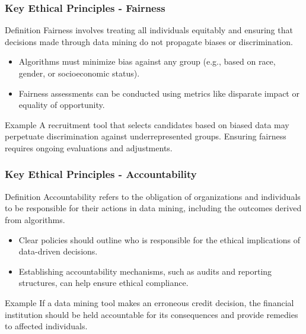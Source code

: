 \documentclass{beamer}
\begin{document}
\begin{frame}[fragile]
    \frametitle{Key Ethical Principles - Fairness}
    \begin{block}{Definition}
    Fairness involves treating all individuals equitably and ensuring that decisions made through data mining do not propagate biases or discrimination.
    \end{block}
    \begin{itemize}
        \item Algorithms must minimize bias against any group (e.g., based on race, gender, or socioeconomic status).
        \item Fairness assessments can be conducted using metrics like disparate impact or equality of opportunity.
    \end{itemize}
    \begin{block}{Example}
    A recruitment tool that selects candidates based on biased data may perpetuate discrimination against underrepresented groups. Ensuring fairness requires ongoing evaluations and adjustments.
    \end{block}
\end{frame}

\begin{frame}[fragile]
    \frametitle{Key Ethical Principles - Accountability}
    \begin{block}{Definition}
    Accountability refers to the obligation of organizations and individuals to be responsible for their actions in data mining, including the outcomes derived from algorithms.
    \end{block}
    \begin{itemize}
        \item Clear policies should outline who is responsible for the ethical implications of data-driven decisions.
        \item Establishing accountability mechanisms, such as audits and reporting structures, can help ensure ethical compliance.
    \end{itemize}
    \begin{block}{Example}
    If a data mining tool makes an erroneous credit decision, the financial institution should be held accountable for its consequences and provide remedies to affected individuals.
    \end{block}
\end{frame}
\end{document}
